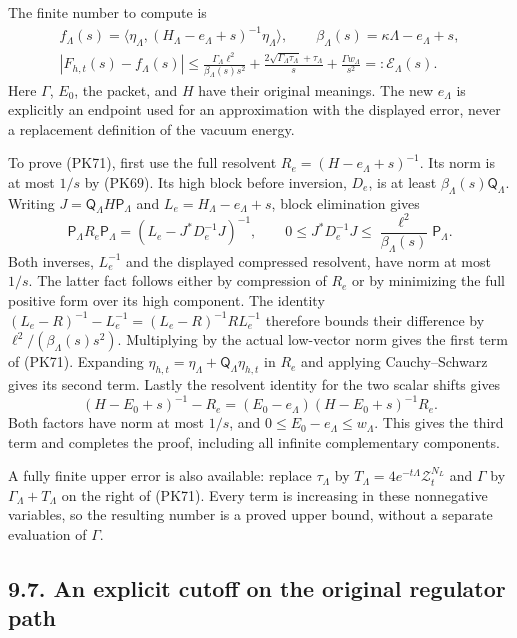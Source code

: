 \documentclass[11pt]{article}
\begin{document}
The finite number to compute is
\[
 \begin{gathered}
 f_\Lambda(s)=
 \langle\eta_\Lambda,
       (H_\Lambda-e_\Lambda+s)^{-1}\eta_\Lambda\rangle,\qquad
 \beta_\Lambda(s)=\kappa\Lambda-e_\Lambda+s,\\
 |F_{h,t}(s)-f_\Lambda(s)|
 \le
 \frac{\Gamma_\Lambda\ell^2}{\beta_\Lambda(s)s^2}
 +\frac{2\sqrt{\Gamma_\Lambda\tau_\Lambda}+\tau_\Lambda}{s}
 +\frac{\Gamma w_\Lambda}{s^2}
 =:\mathcal E_\Lambda(s).
 \end{gathered}\tag{PK71}
\]
Here \(\Gamma\), \(E_0\), the packet, and \(H\) have their original
meanings. The new \(e_\Lambda\) is explicitly an endpoint used for an
approximation with the displayed error, never a replacement definition
of the vacuum energy.

To prove (PK71), first use the full resolvent
\(R_e=(H-e_\Lambda+s)^{-1}\). Its norm is at most \(1/s\) by (PK69).
Its high block before inversion, \(D_e\), is at least
\(\beta_\Lambda(s)\mathsf Q_\Lambda\).
Writing \(J=\mathsf Q_\Lambda H\mathsf P_\Lambda\) and
\(L_e=H_\Lambda-e_\Lambda+s\), block elimination gives
\[
 \mathsf P_\Lambda R_e\mathsf P_\Lambda
       =(L_e-J^*D_e^{-1}J)^{-1},\qquad
 0\le J^*D_e^{-1}J\le
       \frac{\ell^2}{\beta_\Lambda(s)}\mathsf P_\Lambda .
 \]
Both inverses, \(L_e^{-1}\) and the displayed compressed resolvent,
have norm at most \(1/s\). The latter fact follows either by compression
of \(R_e\) or by minimizing the full positive form over its high component.
The identity
\((L_e-R)^{-1}-L_e^{-1}=(L_e-R)^{-1}RL_e^{-1}\)
therefore bounds their difference by
\(\ell^2/(\beta_\Lambda(s)s^2)\). Multiplying by the actual low-vector
norm gives the first term of (PK71). Expanding
\(\eta_{h,t}=\eta_\Lambda+\mathsf Q_\Lambda\eta_{h,t}\) in \(R_e\)
and applying Cauchy–Schwarz gives its second term. Lastly the resolvent
identity for the two scalar shifts gives
\[
 (H-E_0+s)^{-1}-R_e
   =(E_0-e_\Lambda)(H-E_0+s)^{-1}R_e .
 \]
Both factors have norm at most \(1/s\), and
\(0\le E_0-e_\Lambda\le w_\Lambda\). This gives the third term and
completes the proof, including all infinite complementary components.

A fully finite upper error is also available: replace \(\tau_\Lambda\)
by \(T_\Lambda=4e^{-t\Lambda}\mathcal Z_t^{N_L}\) and \(\Gamma\)
by \(\Gamma_\Lambda+T_\Lambda\) on the right of (PK71).
Every term is increasing in these nonnegative variables, so the resulting
number is a proved upper bound, without a separate evaluation of \(\Gamma\).

\subsection*{9.7. An explicit cutoff on the original regulator path}
\end{document}
